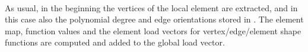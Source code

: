  \\

 As usual, in the beginning the vertices of the local element are extracted, and in this case also the polynomial degree and edge orientations stored in . The element map, function values and the element load vectors for vertex/edge/ele\-ment shape functions are computed and added to the global load vector.


